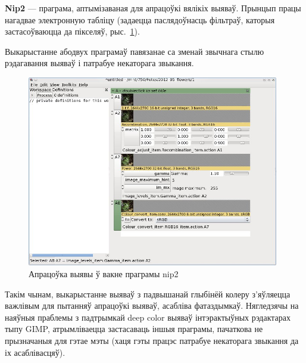 \documentclass[10pt, a5paper]{article}
\begin{document}
\textbf{Nip2} --- праграма, аптымізаваная для апрацоўкі вялікіх выяваў. Прынцып працы нагадвае электронную табліцу (задаецца паслядоўнасць фільтраў, каторыя застасоўваюцца да пікселяў, рыс.~\ref{fig:nip2}).

Выкарыстанне абодвух праграмаў павязанае са зменай звычнага стылю рэдагавання выяваў і патрабуе некаторага звыкання.

\begin{figure}[htpb]
 \includegraphics[width=110mm]{LAS_LVEE_2012_nip2.jpg}
 \caption{Апрацоўка выявы ў вакне праграмы nip2}
 \label{fig:nip2}
\end{figure}

Такім чынам, выкарыстанне выяваў з падвышанай глыбінёй колеру з'яўляецца важлівым для пытанняў апрацоўкі выяваў, асабліва фатаздымкаў. Нягледзячы на наяўныя праблемы з падтрымкай deep color выяваў інтэрактыўных рэдактарах тыпу GIMP, атрымліваецца застасаваць іншыя праграмы, пачаткова не прызначаныя для гэтае мэты (хаця гэты працэс патрабуе некаторага звыкання да іх асаблівасцяў).
\end{document}
